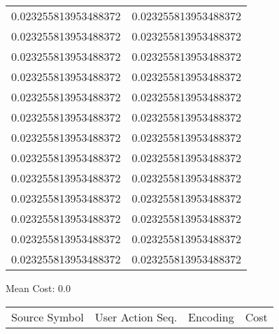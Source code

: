 \documentclass[12pt]{article}
\begin{document}
\begin{tabular}{l l}
0.023255813953488372	&	0.023255813953488372\\
0.023255813953488372	&	0.023255813953488372\\
0.023255813953488372	&	0.023255813953488372\\
0.023255813953488372	&	0.023255813953488372\\
0.023255813953488372	&	0.023255813953488372\\
0.023255813953488372	&	0.023255813953488372\\
0.023255813953488372	&	0.023255813953488372\\
0.023255813953488372	&	0.023255813953488372\\
0.023255813953488372	&	0.023255813953488372\\
0.023255813953488372	&	0.023255813953488372\\
0.023255813953488372	&	0.023255813953488372\\
0.023255813953488372	&	0.023255813953488372\\
0.023255813953488372	&	0.023255813953488372\\
\end{tabular}\newpage
\noindent
\noindent Mean Cost: 0.0\\
\begin{tabular}{l l l l}
Source Symbol	&	User Action Seq.	&	Encoding	&	Cost\\
\end{tabular}
\end{document}
